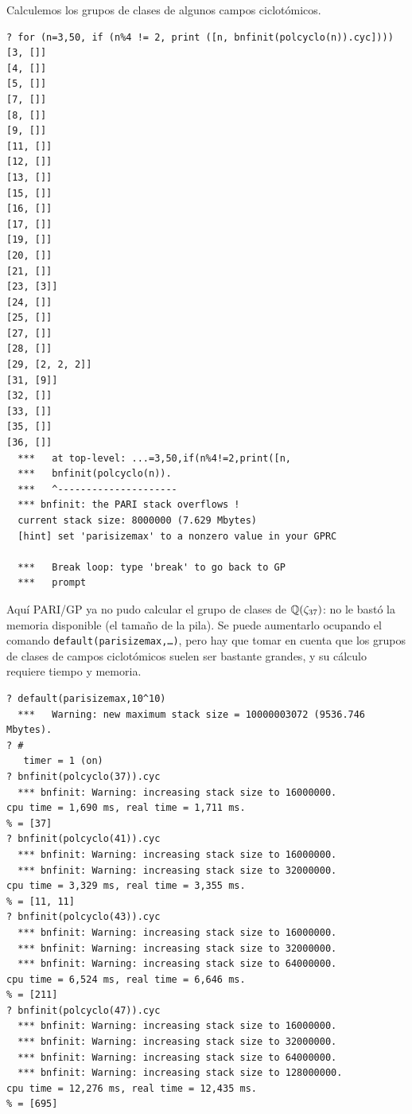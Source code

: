 Calculemos los grupos de clases de algunos campos ciclotómicos.

\begin{shaded}
\begin{verbatim}
? for (n=3,50, if (n%4 != 2, print ([n, bnfinit(polcyclo(n)).cyc])))
[3, []]
[4, []]
[5, []]
[7, []]
[8, []]
[9, []]
[11, []]
[12, []]
[13, []]
[15, []]
[16, []]
[17, []]
[19, []]
[20, []]
[21, []]
[23, [3]]
[24, []]
[25, []]
[27, []]
[28, []]
[29, [2, 2, 2]]
[31, [9]]
[32, []]
[33, []]
[35, []]
[36, []]
  ***   at top-level: ...=3,50,if(n%4!=2,print([n,
  ***   bnfinit(polcyclo(n)).
  ***   ^---------------------
  *** bnfinit: the PARI stack overflows !
  current stack size: 8000000 (7.629 Mbytes)
  [hint] set 'parisizemax' to a nonzero value in your GPRC

  ***   Break loop: type 'break' to go back to GP 
  ***   prompt
\end{verbatim}
\end{shaded}

Aquí PARI/GP ya no pudo calcular el grupo de clases de $\mathbb{Q} (\zeta_{37})$:
no le bastó la memoria disponible (el tamaño de la pila). Se puede aumentarlo
ocupando el comando \texttt{default(parisizemax,\dots)}, pero hay que tomar en
cuenta que los grupos de clases de campos ciclotómicos suelen ser bastante
grandes, y su cálculo requiere tiempo y memoria.

\begin{shaded}
\begin{verbatim}
? default(parisizemax,10^10)
  ***   Warning: new maximum stack size = 10000003072 (9536.746 Mbytes).
? #
   timer = 1 (on)
? bnfinit(polcyclo(37)).cyc
  *** bnfinit: Warning: increasing stack size to 16000000.
cpu time = 1,690 ms, real time = 1,711 ms.
% = [37]
? bnfinit(polcyclo(41)).cyc
  *** bnfinit: Warning: increasing stack size to 16000000.
  *** bnfinit: Warning: increasing stack size to 32000000.
cpu time = 3,329 ms, real time = 3,355 ms.
% = [11, 11]
? bnfinit(polcyclo(43)).cyc
  *** bnfinit: Warning: increasing stack size to 16000000.
  *** bnfinit: Warning: increasing stack size to 32000000.
  *** bnfinit: Warning: increasing stack size to 64000000.
cpu time = 6,524 ms, real time = 6,646 ms.
% = [211]
? bnfinit(polcyclo(47)).cyc
  *** bnfinit: Warning: increasing stack size to 16000000.
  *** bnfinit: Warning: increasing stack size to 32000000.
  *** bnfinit: Warning: increasing stack size to 64000000.
  *** bnfinit: Warning: increasing stack size to 128000000.
cpu time = 12,276 ms, real time = 12,435 ms.
% = [695]
\end{verbatim}
\end{shaded}

